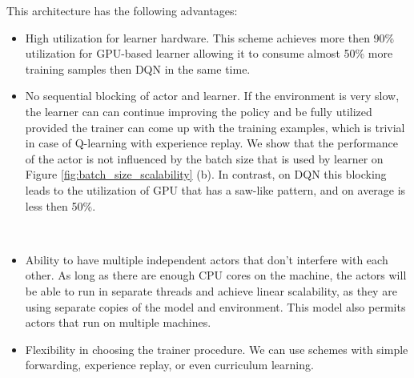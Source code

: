 This architecture has the following advantages:
\begin{itemize}
    \item High utilization for learner hardware. This scheme achieves more then 90\% utilization
        for GPU-based learner allowing it to consume almost 50\% more training samples then DQN in
        the same time.

    \item No sequential blocking of actor and learner. If the environment is very slow, the learner
        can can continue improving the policy and be fully utilized provided the trainer can come up
        with the training examples, which is trivial in case of Q-learning with experience replay.
        We show that the performance of the actor is not influenced by the batch size that is
        used by learner on Figure \ref{fig:batch_size_scalability} (b).
        In contrast, on DQN this blocking leads to the utilization of GPU that has a saw-like
        pattern, and on average is less then 50\%.

        \begin{figure*}[h!]
            \\
            \caption{Dependence of core system parameters on batch size used by learner. Bigger
            batch sizes lead to higher training throughput, and don't influence actors}
            \label{fig:batch_size_scalability}
        \end{figure*}
\end{itemize}

\begin{itemize}
    \item Ability to have multiple independent actors that don't interfere with each other. As long
        as there are enough CPU cores on the machine, the actors will be able to run in separate
        threads and achieve linear scalability, as they are using separate copies of the model and
        environment. This model also permits actors that run on multiple machines.

    \item Flexibility in choosing the trainer procedure. We can use schemes with simple forwarding,
        experience replay, or even curriculum learning.
\end{itemize}

